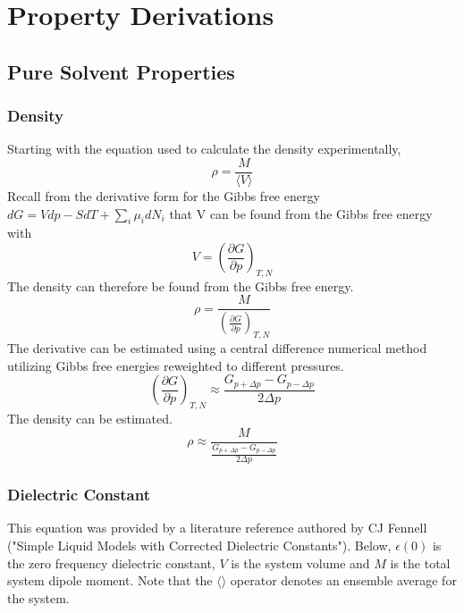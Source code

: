 \documentclass[a4paper,12pt]{article}
\begin{document}
\appendix
\section{Property Derivations}
\subsection{Pure Solvent Properties}
\subsubsection{Density}
\noindent Starting with the equation used to calculate the density experimentally, 
\begin{equation} \rho = \frac{M}{\langle V \rangle} \end{equation}
\noindent Recall from the derivative form for the Gibbs free energy $dG = Vdp -SdT + \sum_i \mu_i dN_i$ that V can be found from the Gibbs free energy with
\begin{equation} V = \left( \frac{\partial G}{\partial p} \right)_{T,N} \end{equation}
\noindent The density can therefore be found from the Gibbs free energy.
\begin{equation} \rho = \frac{M}{ \left( \frac{\partial G}{\partial p} \right)_{T,N}} \end{equation}
\noindent The derivative can be estimated using a central difference numerical method utilizing Gibbs free energies reweighted to different pressures.
\begin{equation} \left( \frac{\partial G}{\partial p} \right)_{T,N} \approx \frac{G_{p + \Delta p} - G_{p-\Delta p}}{2\Delta p} \end{equation}
\noindent The density can be estimated.
\begin{equation} \rho \approx \frac{M}{\frac{G_{p + \Delta p} - G_{p-\Delta p}}{2\Delta p}} \end{equation}


\subsubsection{Dielectric Constant}
\noindent This equation was provided by a literature reference authored by CJ Fennell ("Simple Liquid Models with Corrected Dielectric Constants"). Below, $\epsilon(0)$ is the zero frequency dielectric constant, $V$ is the system volume and $M$ is the total system dipole moment. Note that the $\langle \rangle$ operator denotes an ensemble average for the system.
\end{document}
